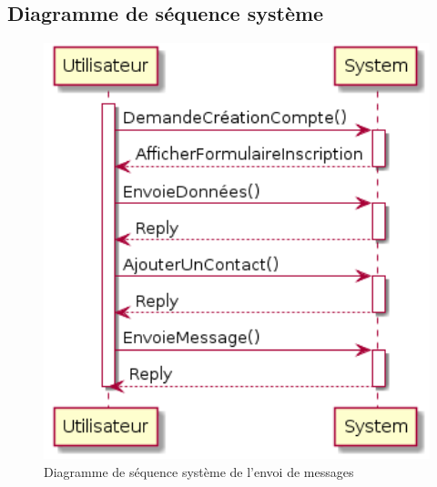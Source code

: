 \documentclass[a4paper,12pt]{article}
\begin{document}
	\subsection{Diagramme de séquence système}
	\begin{figure}[H]
		\centerline{\includegraphics[width=16.5cm]{../diagrammes/img/sequenceSystemeEnvoiMessage.png}}
		\caption{Diagramme de séquence système de l'envoi de messages}
	\end{figure}
\end{document}
